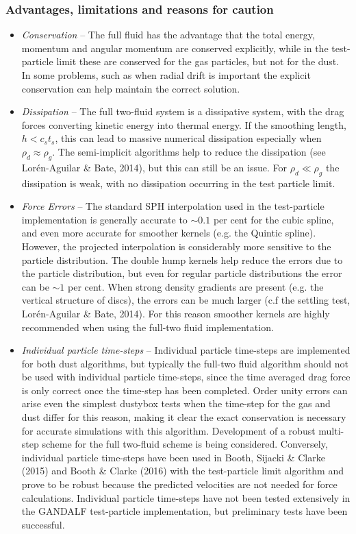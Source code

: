 \documentclass[a4paper]{article}
\begin{document}
\subsubsection{Advantages, limitations and reasons for caution}

\begin{itemize}
\item \emph{Conservation} -- The full fluid has the advantage that the total energy, momentum and angular momentum
are conserved explicitly, while in the test-particle limit these are conserved for the gas particles, but not for the dust. In some problems, such as when radial drift is important the explicit conservation can help maintain the correct solution.

\item \emph{Dissipation} -- The full two-fluid system is a dissipative system, with the drag forces converting kinetic energy into thermal energy. If the smoothing length, $h < c_s t_s$, this can lead to massive numerical dissipation especially when $\rho_d \approx \rho_g$. The semi-implicit algorithms help to reduce the dissipation (see Lor\'en-Aguilar \& Bate, 2014), but this can still be an issue. For $\rho_d \ll \rho_g$ the dissipation is weak, with no dissipation occurring in the test particle limit.

\item \emph{Force Errors} -- The standard SPH interpolation used in the test-particle implementation is generally accurate to $\sim 0.1$ per cent for the cubic spline, and even more accurate for smoother kernels (e.g. the Quintic spline). However, the projected interpolation is considerably more sensitive to the particle distribution. The double hump kernels help reduce the errors due to the particle distribution, but even for regular particle distributions the error can be $\sim 1$ per cent. When strong density gradients are present (e.g. the vertical structure of discs), the errors can be much larger (c.f the settling test, Lor\'en-Aguilar \& Bate, 2014). For this reason smoother kernels are highly recommended when using the full-two fluid implementation.

\item \emph{Individual particle time-steps} -- Individual particle time-steps are implemented for both dust algorithms, but typically the full-two fluid algorithm should not be used with individual particle time-steps, since the time averaged drag force is only correct once the time-step has been completed. Order unity errors can arise even the simplest dustybox tests when the time-step for the gas and dust differ for this reason, making it clear the exact conservation is necessary for accurate simulations with this algorithm. Development of a robust multi-step scheme for the full two-fluid scheme is being considered. Conversely, individual particle time-steps have been used in Booth, Sijacki \& Clarke (2015) and Booth \& Clarke (2016) with the test-particle limit algorithm and prove to be robust because the predicted velocities are not needed for force calculations. Individual particle time-steps have not been tested extensively in the GANDALF test-particle implementation, but preliminary tests have been successful.


\end{itemize}
\end{document}
